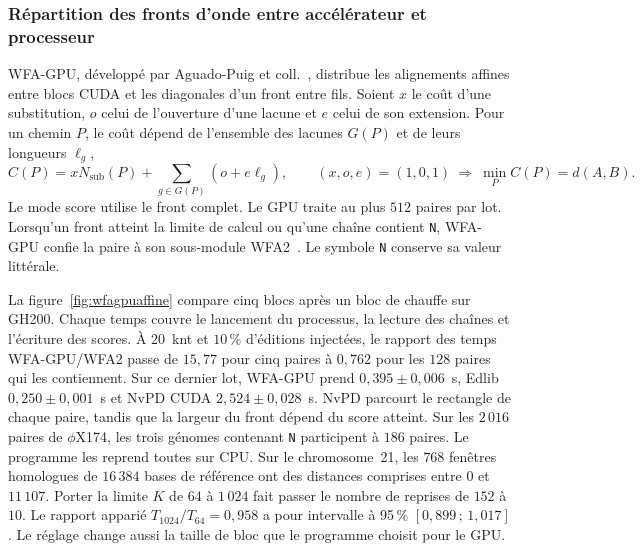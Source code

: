 \subsubsection{Répartition des fronts d’onde entre accélérateur et processeur}\label{sec:wfa-gpu-batch}
WFA-GPU, développé par Aguado-Puig et coll.~\cite{wfagpuaffine,wfagpucode}, distribue les alignements affines entre blocs CUDA et les diagonales d’un front entre fils. Soient \(x\) le coût d’une substitution, \(o\) celui de l’ouverture d’une lacune et \(e\) celui de son extension. Pour un chemin \(P\), le coût dépend de l’ensemble des lacunes \(G(P)\) et de leurs longueurs \(\ell_g\),
\[
 C(P)=xN_{\mathrm{sub}}(P)+\sum_{g\in G(P)}(o+e\ell_g),\qquad
 (x,o,e)=(1,0,1)\ \Longrightarrow\ \min_P C(P)=d(A,B).
\]
Le mode score utilise le front complet. Le GPU traite au plus \(512\) paires par lot. Lorsqu’un front atteint la limite de calcul ou qu’une chaîne contient \texttt{N}, WFA-GPU confie la paire à son sous-module WFA2~\cite{wfa2gpucode}. Le symbole \texttt{N} conserve sa valeur littérale.

La figure~\ref{fig:wfagpuaffine} compare cinq blocs après un bloc de chauffe sur GH200. Chaque temps couvre le lancement du processus, la lecture des chaînes et l’écriture des scores. À \(20\)~knt et \(10\,\%\) d’éditions injectées, le rapport des temps WFA-GPU/WFA2 passe de \(15{,}77\) pour cinq paires à \(0{,}762\) pour les \(128\) paires qui les contiennent. Sur ce dernier lot, WFA-GPU prend \(0{,}395\pm0{,}006\)~s, Edlib \(0{,}250\pm0{,}001\)~s et NvPD CUDA \(2{,}524\pm0{,}028\)~s. NvPD parcourt le rectangle de chaque paire, tandis que la largeur du front dépend du score atteint.
\FloatBarrier
Sur les \(2\,016\) paires de \(\phi\)X174, les trois génomes contenant \texttt{N} participent à \(186\) paires. Le programme les reprend toutes sur CPU. Sur le chromosome~21, les \(768\) fenêtres homologues de \(16\,384\) bases de référence ont des distances comprises entre \(0\) et \(11\,107\). Porter la limite \(K\) de \(64\) à \(1\,024\) fait passer le nombre de reprises de \(152\) à \(10\). Le rapport apparié \(T_{1024}/T_{64}=0{,}958\) a pour intervalle à 95\,\% \([0{,}899\,;\,1{,}017]\). Le réglage change aussi la taille de bloc que le programme choisit pour le GPU.

